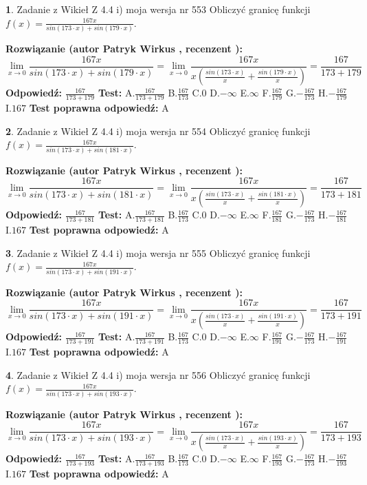 \documentclass[12pt, a4paper]{article}
\theoremstyle{definition} %
\newtheorem{zad}{}
\newcommand{\zadStart}[1]{\begin{zad}#1\newline}
\newcommand{\zadStop}{\end{zad}}
\newcommand{\rozwStart}[2]{\noindent \textbf{Rozwiązanie (autor #1 , recenzent #2): }\newline}
\newcommand{\rozwStop}{\newline}
\newcommand{\odpStart}{\noindent \textbf{Odpowiedź:}\newline}
\newcommand{\odpStop}{\newline}
\newcommand{\testStart}{\noindent \textbf{Test:}\newline}
\newcommand{\testStop}{\newline}
\newcommand{\kluczStart}{\noindent \textbf{Test poprawna odpowiedź:}\newline}
\newcommand{\kluczStop}{\newline}
\begin{document}
\zadStart{Zadanie z Wikieł Z 4.4 i) moja wersja nr 553}
Obliczyć granicę funkcji $f(x)=\frac{167x}{sin(173\cdot x) +sin(179\cdot x)}$.
\zadStop
\rozwStart{Patryk Wirkus}{}
$$\lim\limits_{x\to 0}\frac{167x}{sin(173\cdot x) +sin(179\cdot x)}=\lim\limits_{x\to 0}\frac{167x}{x(\frac{sin(173\cdot x)}{x}+\frac{sin(179\cdot x)}{x})}=\frac{167}{173+179}$$
\rozwStop
\odpStart
$\frac{167}{173+179}$
\odpStop
\testStart
A.$\frac{167}{173+179}$
B.$\frac{167}{173}$
C.$0$
D.$-\infty$
E.$\infty$
F.$\frac{167}{179}$
G.$-\frac{167}{173}$
H.$-\frac{167}{179}$
I.$167$
\testStop
\kluczStart
A
\kluczStop



\zadStart{Zadanie z Wikieł Z 4.4 i) moja wersja nr 554}
Obliczyć granicę funkcji $f(x)=\frac{167x}{sin(173\cdot x) +sin(181\cdot x)}$.
\zadStop
\rozwStart{Patryk Wirkus}{}
$$\lim\limits_{x\to 0}\frac{167x}{sin(173\cdot x) +sin(181\cdot x)}=\lim\limits_{x\to 0}\frac{167x}{x(\frac{sin(173\cdot x)}{x}+\frac{sin(181\cdot x)}{x})}=\frac{167}{173+181}$$
\rozwStop
\odpStart
$\frac{167}{173+181}$
\odpStop
\testStart
A.$\frac{167}{173+181}$
B.$\frac{167}{173}$
C.$0$
D.$-\infty$
E.$\infty$
F.$\frac{167}{181}$
G.$-\frac{167}{173}$
H.$-\frac{167}{181}$
I.$167$
\testStop
\kluczStart
A
\kluczStop



\zadStart{Zadanie z Wikieł Z 4.4 i) moja wersja nr 555}
Obliczyć granicę funkcji $f(x)=\frac{167x}{sin(173\cdot x) +sin(191\cdot x)}$.
\zadStop
\rozwStart{Patryk Wirkus}{}
$$\lim\limits_{x\to 0}\frac{167x}{sin(173\cdot x) +sin(191\cdot x)}=\lim\limits_{x\to 0}\frac{167x}{x(\frac{sin(173\cdot x)}{x}+\frac{sin(191\cdot x)}{x})}=\frac{167}{173+191}$$
\rozwStop
\odpStart
$\frac{167}{173+191}$
\odpStop
\testStart
A.$\frac{167}{173+191}$
B.$\frac{167}{173}$
C.$0$
D.$-\infty$
E.$\infty$
F.$\frac{167}{191}$
G.$-\frac{167}{173}$
H.$-\frac{167}{191}$
I.$167$
\testStop
\kluczStart
A
\kluczStop



\zadStart{Zadanie z Wikieł Z 4.4 i) moja wersja nr 556}
Obliczyć granicę funkcji $f(x)=\frac{167x}{sin(173\cdot x) +sin(193\cdot x)}$.
\zadStop
\rozwStart{Patryk Wirkus}{}
$$\lim\limits_{x\to 0}\frac{167x}{sin(173\cdot x) +sin(193\cdot x)}=\lim\limits_{x\to 0}\frac{167x}{x(\frac{sin(173\cdot x)}{x}+\frac{sin(193\cdot x)}{x})}=\frac{167}{173+193}$$
\rozwStop
\odpStart
$\frac{167}{173+193}$
\odpStop
\testStart
A.$\frac{167}{173+193}$
B.$\frac{167}{173}$
C.$0$
D.$-\infty$
E.$\infty$
F.$\frac{167}{193}$
G.$-\frac{167}{173}$
H.$-\frac{167}{193}$
I.$167$
\testStop
\kluczStart
A
\kluczStop
\end{document}
